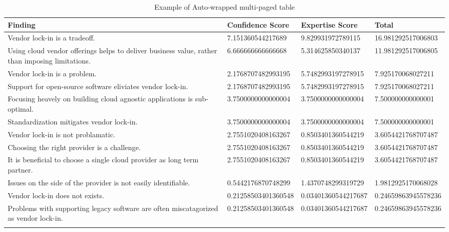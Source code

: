 
\renewcommand\arraystretch{1.5}%
\begin{longtable}{|p{10cm}|p{2cm}|p{2cm}|}
\hline
\textbf{Finding}  & \textbf{Confidence Score} & \textbf{Expertise Score} & \textbf{Total} \\ \hline
\endhead
Vendor lock-in is a tradeoff. & 7.151360544217689 & 9.829931972789115 & 16.981292517006803 \\ \hline
Using cloud vendor offerings helps to deliver business value, rather than imposing limitations. & 6.666666666666668 & 5.314625850340137 & 11.981292517006805 \\ \hline
Vendor lock-in is a problem. & 2.1768707482993195 & 5.7482993197278915 & 7.925170068027211 \\ \hline
Support for open-source software eliviates vendor lock-in. & 2.1768707482993195 & 5.7482993197278915 & 7.925170068027211 \\ \hline
Focusing heavely on building cloud agnostic applications is sub-optimal. & 3.7500000000000004 & 3.7500000000000004 & 7.500000000000001 \\ \hline
Standardization mitigates vendor lock-in. & 3.7500000000000004 & 3.7500000000000004 & 7.500000000000001 \\ \hline
Vendor lock-in is not problamatic. & 2.7551020408163267 & 0.8503401360544219 & 3.6054421768707487 \\ \hline
Choosing the right provider is a challenge. & 2.7551020408163267 & 0.8503401360544219 & 3.6054421768707487 \\ \hline
It is beneficial to choose a single cloud provider as long term partner. & 2.7551020408163267 & 0.8503401360544219 & 3.6054421768707487 \\ \hline
Issues on the side of the provider is not easily identifiable. & 0.5442176870748299 & 1.4370748299319729 & 1.9812925170068028 \\ \hline
Vendor lock-in does not exists. & 0.21258503401360548 & 0.03401360544217687 & 0.24659863945578236 \\ \hline
Problems with supporting legacy software are often miscatagorized as vendor lock-in. & 0.21258503401360548 & 0.03401360544217687 & 0.24659863945578236 \\ \hline
\caption{Example of Auto-wrapped multi-paged table}
\label{tab:table1}
\end{longtable}
